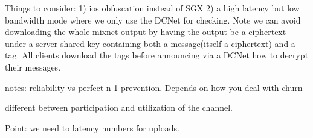 Things to consider:
1) ios obfuscation instead of SGX
2) a high latency but low bandwidth mode where we only use the DCNet for checking. Note we can avoid downloading the whole mixnet output by having the output be a ciphertext under a server shared key containing both a message(itself a ciphertext) and a tag. All clients download the tags before announcing via a DCNet how to decrypt their messages.



notes:
reliability vs perfect n-1 prevention. Depends on how you deal with churn

different between participation and utilization of the channel.


Point: we need to latency numbers for uploads.





